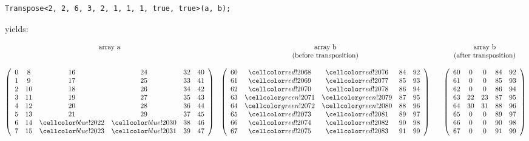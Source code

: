 \vspace{1cm}
\begin{minipage}{\linewidth}
	\begin{verbatim}
Transpose<2, 2, 6, 3, 2, 1, 1, 1, true, true>(a, b);
	\end{verbatim}
	yields:
	
	\begin{align*}
	\begin{matrix}
	\textrm{array a} & \textrm{array b}  & & \textrm{array b}\\
	&\textrm{(before transposition)}&&\textrm{(after transposition)}\\
	\\
	\left(\begin{array}{cccccc}
	0 & 8  & 16         & 24         & 32 & 40\\
	1 & 9  & 17         & 25         & 33 & 41\\
	2 & 10 & 18         & 26         & 34 & 42\\
	3 & 11 & 19         & 27         & 35 & 43\\
	4 & 12 & 20         & 28         & 36 & 44\\
	5 & 13 & 21         & 29         & 37 & 45\\
	6 & 14 & \colSrc 22 & \colSrc 30 & 38 & 46\\
	7 & 15 & \colSrc 23 & \colSrc 31 & 39 & 47
	\end{array}\right) 
	&
	\left(\begin{array}{ccccc}
	60 & \colOwr 68 & \colOwr 76 & 84 & 92\\
	61 & \colOwr 69 & \colOwr 77 & 85 & 93\\
	62 & \colOwr 70 & \colOwr 78 & 86 & 94\\
	63 & \colTgt 71 & \colTgt 79 & 87 & 95\\
	64 & \colTgt 72 & \colTgt 80 & 88 & 96\\
	65 & \colOwr 73 & \colOwr 81 & 89 & 97\\
	66 & \colOwr 74 & \colOwr 82 & 90 & 98\\
	67 & \colOwr 75 & \colOwr 83 & 91 & 99
	\end{array}\right) 
	&&
	\left(\begin{array}{ccccc}
	60 & 0  & 0  & 84 & 92\\
	61 & 0  & 0  & 85 & 93\\
	62 & 0  & 0  & 86 & 94\\
	63 & 22 & 23 & 87 & 95\\
	64 & 30 & 31 & 88 & 96\\
	65 & 0  & 0  & 89 & 97\\
	66 & 0  & 0  & 90 & 98\\
	67 & 0  & 0  & 91 & 99
	\end{array}\right)
	\end{matrix}
	\end{align*}
\end{minipage}



